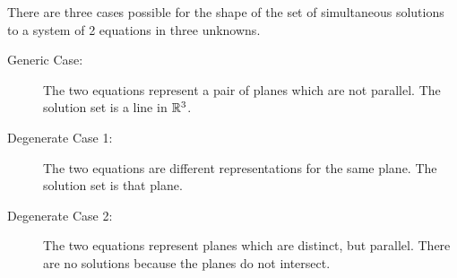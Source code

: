 \documentclass[00-livre-main.tex]{subfiles}
\begin{document}
\begin{theorem}
There are three cases possible for the shape of the set of simultaneous solutions to a system of 2 equations in three unknowns.
\begin{description}
\item[Generic Case:] The two equations represent a pair of planes which are not parallel. The solution set is a line in $\mathbb{R}^3$.
\item[Degenerate Case 1:] The two equations are different representations for the same plane. The solution set is that plane.
\item[Degenerate Case 2:] The two equations represent planes which are distinct, but parallel. There are no solutions because the planes do not intersect.
\end{description}
\end{theorem}
\end{document}
